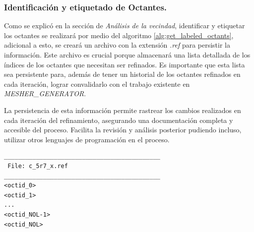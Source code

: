 




\subsubsection{Identificación y etiquetado de Octantes.}

Como se explicó en la sección de \textit{Análisis de la vecindad}, identificar y etiquetar los octantes se realizará por medio del algoritmo \ref{alg:get_labeled_octants}, adicional a esto, se creará un archivo con la extensión \textit{.ref} para persistir la información. Este archivo es crucial porque almacenará una lista detallada de los índices de los octantes que necesitan ser refinados. Es importante que esta lista sea persistente para, además de tener un historial de los octantes refinados en cada iteración, lograr convalidarlo con el trabajo existente en \textit{MESHER\_GENERATOR}.

La persistencia de esta información permite rastrear los cambios realizados en cada iteración del refinamiento, asegurando una documentación completa y accesible del proceso. Facilita la revisión y análisis posterior pudiendo incluso, utilizar otros lenguajes de programación en el proceso.

\begin{lstlisting}[style=TxtStyle,caption={Lista de octantes a refinar en malla inicial.\\ Fuente: Elaboración propia.},label={code:oct_labeled_c_5r7_0}]
____________________________________________
 File: c_5r7_x.ref 
____________________________________________
<octid_0>
<octid_1>
...
<octid_NOL-1>
<octid_NOL>
\end{lstlisting}

